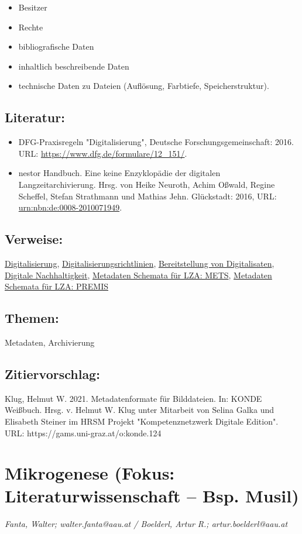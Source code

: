 \documentclass{article}
\begin{document}
        \begin{itemize}\item {Besitzer}\item {Rechte}\item {bibliografische Daten}\item {inhaltlich beschreibende Daten}\item {technische Daten zu Dateien (Auflösung, Farbtiefe, Speicherstruktur).}\end{itemize}\subsection*{Literatur:}\begin{itemize}\item DFG-Praxisregeln "Digitalisierung", Deutsche Forschungsgemeinschaft: 2016. URL: \url{https://www.dfg.de/formulare/12_151/}.\item nestor Handbuch. Eine keine Enzyklopädie der digitalen Langzeitarchivierung. Hrsg. von Heike Neuroth, Achim Oßwald, Regine Scheffel, Stefan Strathmann und Mathias Jehn. Glückstadt: 2016, URL: \url{urn:nbn:de:0008-2010071949}.\end{itemize}\subsection*{Verweise:}\href{https://gams.uni-graz.at/o:konde.60}{Digitalisierung}, \href{https://gams.uni-graz.at/o:konde.63}{Digitalisierungsrichtlinien}, \href{https://gams.uni-graz.at/o:konde.36}{Bereitstellung von Digitalisaten}, \href{https://gams.uni-graz.at/o:konde.6}{Digitale Nachhaltigkeit}, \href{https://gams.uni-graz.at/o:konde.129}{Metadaten Schemata für LZA: METS}, \href{https://gams.uni-graz.at/o:konde.130}{Metadaten Schemata für LZA: PREMIS}\subsection*{Themen:}Metadaten, Archivierung\subsection*{Zitiervorschlag:}Klug, Helmut W. 2021. Metadatenformate für Bilddateien. In: KONDE Weißbuch. Hrsg. v. Helmut W. Klug unter Mitarbeit von Selina Galka und Elisabeth Steiner im HRSM Projekt "Kompetenznetzwerk Digitale Edition". URL: https://gams.uni-graz.at/o:konde.124\newpage\section*{Mikrogenese (Fokus: Literaturwissenschaft – Bsp. Musil)} \emph{Fanta, Walter; walter.fanta@aau.at / Boelderl, Artur R.;
                  artur.boelderl@aau.at}\\
        
\end{document}
